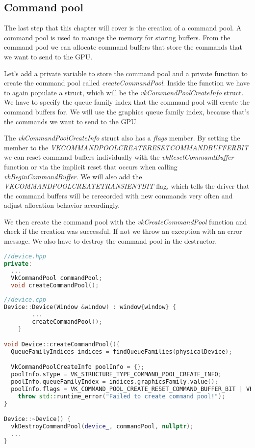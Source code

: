 \documentclass[12pt]{report} \usepackage{preamble}
\begin{document}
\subsection{Command pool}

The last step that this chapter will cover is the creation of a command pool. A command pool is used
to manage the memory for storing buffers. From the command pool we can allocate command buffers that
store the commands that we want to send to the \ac{GPU}.

Let's add a private variable to store the command pool and a private function to create the command pool
called \textit{createCommandPool}. Inside the function we have to again populate a struct, which will be
the \textit{vkCommandPoolCreateInfo} struct. We have to specify the queue family index that the command pool
will create the command buffers for. We will use the graphics queue family index, because that's the commands
we want to send to the \ac{GPU}.

The \textit{vkCommandPoolCreateInfo} struct also has a \textit{flags} member. By setting the member to the
\textit{VK\textunderscore COMMAND\textunderscore POOL\textunderscore CREATE\textunderscore RESET\textunderscore COMMAND\textunderscore BUFFER\textunderscore BIT}
we can reset command buffers individually with the \textit{vkResetCommandBuffer} function or via the implicit
reset that occurs when calling \textit{vkBeginCommandBuffer}. We will also add the
\textit{VK\textunderscore COMMAND\textunderscore POOL\textunderscore CREATE\textunderscore TRANSIENT\textunderscore BIT}
flag, which tells the driver that the command buffers will be rerecorded with new commands very often and adjust allocation
behavior accordingly.

We then create the command pool with the \textit{vkCreateCommandPool} function and check if the creation
was successful. If not we throw an exception with an error message. We also have to destroy the command pool
in the destructor.

\begin{lstlisting}[language=C++]
//device.hpp
private:
  ...
  VkCommandPool commandPool;
  void createCommandPool();
\end{lstlisting}

\begin{lstlisting}[language=C++]
//device.cpp
Device::Device(Window &window) : window{window} {
		...
		createCommandPool();
	}

void Device::createCommandPool(){
  QueueFamilyIndices indices = findQueueFamilies(physicalDevice);

  VkCommandPoolCreateInfo poolInfo = {};
  poolInfo.sType = VK_STRUCTURE_TYPE_COMMAND_POOL_CREATE_INFO;
  poolInfo.queueFamilyIndex = indices.graphicsFamily.value();
  poolInfo.flags = VK_COMMAND_POOL_CREATE_RESET_COMMAND_BUFFER_BIT | VK_COMMAND_POOL_CREATE_TRANSIENT_BIT;
    throw std::runtime_error("Failed to create command pool!");
}

Device::~Device() {
  vkDestroyCommandPool(device_, commandPool, nullptr);
  ...
}
\end{lstlisting}
\end{document}
